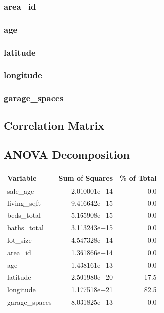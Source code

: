 \documentclass[
]{article}
\begin{document}
\subsubsection{area\_id}\label{area_id}

\subsubsection{age}\label{age}

\subsubsection{latitude}\label{latitude}

\subsubsection{longitude}\label{longitude}

\subsubsection{garage\_spaces}\label{garage_spaces}

\subsection{Correlation Matrix}\label{correlation-matrix}

\subsection{ANOVA Decomposition}\label{anova-decomposition}

{\def\LTcaptype{} %
\begin{longtable}[]{@{}lrr@{}}
\toprule\noalign{}
Variable & Sum of Squares & \% of Total \\
\midrule\noalign{}
\endhead
\bottomrule\noalign{}
\endlastfoot
sale\_age & 2.010001e+14 & 0.0 \\
living\_sqft & 9.416642e+15 & 0.0 \\
beds\_total & 5.165908e+15 & 0.0 \\
baths\_total & 3.113243e+15 & 0.0 \\
lot\_size & 4.547328e+14 & 0.0 \\
area\_id & 1.361866e+14 & 0.0 \\
age & 1.438161e+13 & 0.0 \\
latitude & 2.501980e+20 & 17.5 \\
longitude & 1.177518e+21 & 82.5 \\
garage\_spaces & 8.031825e+13 & 0.0 \\
\end{longtable}
}
\end{document}
